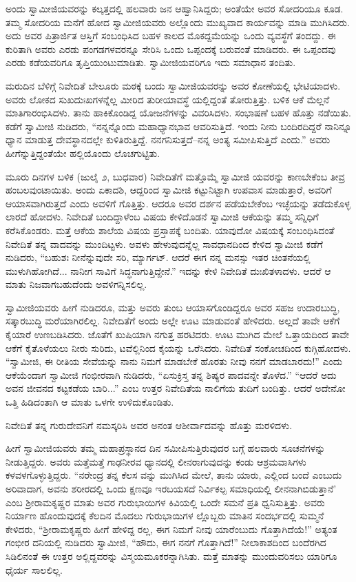 ಅಂದು ಸ್ವಾಮೀಜಿಯವರನ್ನು ಕಲ್ಕತ್ತದಲ್ಲಿ ಹಲವಾರು ಜನ ಆಹ್ವಾನಿಸಿದ್ದರು; ಅಂತೆಯೇ ಅವರ ಸೋದರಿಯೂ ಕೂಡ. ತಮ್ಮ ಸೋದರಿಯ ಮನೆಗೆ ಹೋದ ಸ್ವಾಮೀಜಿಯವರು ಅಲ್ಲೊಂದು ಮುಖ್ಯವಾದ ಕಾರ್ಯವನ್ನು ಮಾಡಿ ಮುಗಿಸಿದರು. ಅದು ಅವರ ಪಿತ್ರಾರ್ಜಿತ ಆಸ್ತಿಗೆ ಸಂಬಂಧಿಸಿದ ಬಹಳ ಕಾಲದ ಮೊಕದ್ದಮೆಯನ್ನು ಒಂದು ವ್ಯವಸ್ಥೆಗೆ ತಂದದ್ದು. ಈ ಕುರಿತಾಗಿ ಅವರು ಎರಡು ಪಂಗಡಗಳವರನ್ನೂ ಸೇರಿಸಿ ಒಂದು ಒಪ್ಪಂದಕ್ಕೆ ಬರುವಂತೆ ಮಾಡಿದರು. ಈ ಒಪ್ಪಂದವು ಎರಡು ಕಡೆಯವರಿಗೂ ತೃಪ್ತಿಯುಂಟುಮಾಡಿತು. ಸ್ವಾಮೀಜಿಯವರಿಗೂ ಇದು ಸಮಾಧಾನ ತಂದಿತು.

ಮರುದಿನ ಬೆಳಿಗ್ಗೆ ನಿವೇದಿತೆ ಬೇಲೂರು ಮಠಕ್ಕೆ ಬಂದು ಸ್ವಾಮೀಜಿಯವರನ್ನು ಅವರ ಕೋಣೆಯಲ್ಲಿ ಭೇಟಿಯಾದಳು. ಅವರು ಲೋಕದ ಸುಖದುಃಖಗಳನ್ನೆಲ್ಲ ಮೀರಿದ ತುರೀಯಾವಸ್ಥೆ ಯಲ್ಲಿದ್ದಂತೆ ತೋರುತ್ತಿತ್ತು. ಬಳಿಕ ಆಕೆ ಮೆಲ್ಲನೆ ಮಾತಿಗಾರಂಭಿಸಿದಳು. ತಾನು ಹಾಕಿಕೊಂಡಿದ್ದ ಯೋಜನೆಗಳನ್ನು ವಿವರಿಸಿದಳು. ಸಂಭಾಷಣೆ ಬಹಳ ಹೊತ್ತು ನಡೆಯಿತು. ಕಡೆಗೆ ಸ್ವಾಮೀಜಿ ನುಡಿದರು, “ನನ್ನನ್ನೊಂದು ಮಹಾಧ್ಯಾನಭಾವ ಆವರಿಸುತ್ತಿದೆ. ಇಂದು ನೀನು ಬಂದಿರದಿದ್ದರೆ ನಾನಿನ್ನೂ ಧ್ಯಾನ ಮಾಡುತ್ತ ದೇವಸ್ಥಾನದಲ್ಲೇ ಕುಳಿತಿರುತ್ತಿದ್ದೆ. ನನಗನಿಸುತ್ತದೆ–ನನ್ನ ಅಂತ್ಯ ಸಮೀಪಿಸುತ್ತಿದೆ ಎಂದು.” ಅವರು ಹೀಗೆನ್ನುತ್ತಿದ್ದಂತೆಯೇ ಹಲ್ಲಿಯೊಂದು ಲೊಚಗುಟ್ಟಿತು.

ಮೂರು ದಿನಗಳ ಬಳಿಕ (ಜುಲೈ ೨, ಬುಧವಾರ) ನಿವೇದಿತೆಗೆ ಮತ್ತೊಮ್ಮೆ ಸ್ವಾಮೀಜಿ ಯವರನ್ನು ಕಾಣಬೇಕೆಂಬ ತೀವ್ರ ಹಂಬಲವುಂಟಾಯಿತು. ಅಂದು ಏಕಾದಶಿ, ಆದ್ದರಿಂದ ಸ್ವಾಮೀಜಿ ಕಟ್ಟುನಿಟ್ಟಾಗಿ ಉಪವಾಸ ಮಾಡುತ್ತಾರೆ, ಅವರಿಗೆ ಆಯಾಸವಾಗಿರುತ್ತದೆ ಎಂದು ಅವಳಿಗೆ ಗೊತ್ತಿತ್ತು. ಆದರೂ ಅವರ ದರ್ಶನ ಪಡೆಯಬೇಕೆಂಬ ಇಚ್ಛೆಯನ್ನು ತಡೆದುಕೊಳ್ಳ ಲಾರದೆ ಹೋದಳು. ನಿವೇದಿತೆ ಬಂದಿದ್ದಾಳೆಂಬ ವಿಷಯ ಕೇಳಿದೊಡನೆ ಸ್ವಾಮೀಜಿ ಆಕೆಯನ್ನು ತಮ್ಮ ಸನ್ನಿಧಿಗೆ ಕರೆಸಿಕೊಂಡರು. ಮತ್ತೆ ಆಕೆಯ ಶಾಲೆಯ ವಿಷಯ ಪ್ರಸ್ತಾಪಕ್ಕೆ ಬಂದಿತು. ಯಾವುದೋ ವಿಷಯಕ್ಕೆ ಸಂಬಂಧಿಸಿದಂತೆ ನಿವೇದಿತೆ ತನ್ನ ವಾದವನ್ನು ಮುಂದಿಟ್ಟಳು. ಅವಳು ಹೇಳುವುದನ್ನೆಲ್ಲ ಸಾವಧಾನದಿಂದ ಕೇಳಿದ ಸ್ವಾಮೀಜಿ ಕಡೆಗೆ ನುಡಿದರು, “ಬಹುಶಃ ನೀನೆನ್ನುವುದೇ ಸರಿ, ಮ್ಯಾರ್ಗಟ್. ಆದರೆ ಈಗ ನನ್ನ ಮನಸ್ಸು ಇತರ ಚಿಂತನೆಯಲ್ಲಿ ಮುಳುಗಿಹೋಗಿದೆ... ನಾನೀಗ ಸಾವಿಗೆ ಸಿದ್ಧನಾಗುತ್ತಿದ್ದೇನೆ.” ಇದನ್ನು ಕೇಳಿ ನಿವೇದಿತೆ ದುಃಖಿತಳಾದಳು. ಆದರೆ ಆ ಮಾತು ನಿಜವಾಗಬಹುದೆಂದು ಅವಳಿಗನ್ನಿಸಲಿಲ್ಲ.

ಸ್ವಾಮೀಜಿಯವರು ಹೀಗೆ ನುಡಿದರೂ, ಮತ್ತು ಅವರು ತುಂಬ ಆಯಾಸಗೊಂಡಿದ್ದರೂ ಅವರ ಸಹಜ ಉದಾರಬುದ್ಧಿ, ಸತ್ಕಾರಬುದ್ಧಿ ಮರೆಯಾಗಿರಲಿಲ್ಲ. ನಿವೇದಿತೆಗೆ ಅಂದು ಅಲ್ಲೇ ಊಟ ಮಾಡುವಂತೆ ಹೇಳಿದರು. ಅಲ್ಲದೆ ತಾವೇ ಆಕೆಗೆ ಕೈಯಾರೆ ಉಣಬಡಿಸಿದರು. ಜೊತೆಗೆ ಖುಷಿಯಾಗಿ ನಗುತ್ತ ಹರಟಿದರು. ಊಟ ಮುಗಿದ ಮೇಲೆ ಒತ್ತಾಯದಿಂದ ತಾವೇ ಆಕೆಗೆ ಕೈತೊಳೆಯಲು ನೀರು ಸುರಿದು, ಟವೆಲ್ಲಿನಿಂದ ಕೈಯನ್ನು ಒರೆಸಿದರು. ನಿವೇದಿತೆ ಸಂಕೋಚದಿಂದ ಕುಗ್ಗಿಹೋದಳು. “ಸ್ವಾಮೀಜಿ, ಈ ರೀತಿಯ ಸೇವೆಯನ್ನು ನಾನು ನಿಮಗೆ ಮಾಡಬೇಕೆ ಹೊರತು ನೀವು ನನಗೆ ಮಾಡಬಾರದು!” ಎಂದು ಆಕೆಯೆಂದಾಗ ಸ್ವಾಮೀಜಿ ಗಂಭೀರವಾಗಿ ನುಡಿದರು, “ಏಸುಕ್ರಿಸ್ತ ತನ್ನ ಶಿಷ್ಯರ ಪಾದವನ್ನೇ ತೊಳೆದ.” “ಆದರೆ ಅದು ಅವನ ಜೀವನದ ಕಟ್ಟಕಡೆಯ ಬಾರಿ...” ಎಂಬ ಉತ್ತರ ನಿವೇದಿತೆಯ ನಾಲಿಗೆಯ ತುದಿಗೆ ಬಂದಿತ್ತು. ಆದರೆ ಅದೇನೋ ಒತ್ತಿ ಹಿಡಿದಂತಾಗಿ ಆ ಮಾತು ಒಳಗೇ ಉಳಿದುಕೊಂಡಿತು.

ನಿವೇದಿತೆ ತನ್ನ ಗುರುದೇವನಿಗೆ ನಮಸ್ಕರಿಸಿ ಅವರ ಅನಂತ ಆಶೀರ್ವಾದವನ್ನು ಹೊತ್ತು ಮರಳಿದಳು.

ಹೀಗೆ ಸ್ವಾಮೀಜಿಯವರು ತಮ್ಮ ಮಹಾಪ್ರಸ್ಥಾನದ ದಿನ ಸಮೀಪಿಸುತ್ತಿರುವುದರ ಬಗ್ಗೆ ಹಲವಾರು ಸೂಚನೆಗಳನ್ನು ನೀಡುತ್ತಿದ್ದರು. ಅವರು ಮತ್ತೆಮತ್ತೆ ಗಾಢನೀರವ ಧ್ಯಾನದಲ್ಲಿ ಲೀನರಾಗುವುದನ್ನು ಕಂಡು ಆಶ್ರಮವಾಸಿಗಳು ಕಳವಳಗೊಳ್ಳುತ್ತಿದ್ದರು. “ನರೇಂದ್ರ ತನ್ನ ಕೆಲಸ ವನ್ನು ಮುಗಿಸಿದ ಮೇಲೆ, ತಾನು ಯಾರು, ಎಲ್ಲಿಂದ ಬಂದೆ ಎಂಬುದು ಅರಿವಾದಾಗ, ಅವನು ಶರೀರದಲ್ಲಿ ಒಂದು ಕ್ಷಣವೂ ಇರಬಯಸದೆ ನಿರ್ವಿಕಲ್ಪ ಸಮಾಧಿಯಲ್ಲಿ ಲೀನನಾಗಿಬಿಡುತ್ತಾನೆ’ ಎಂಬ ಶ್ರೀರಾಮಕೃಷ್ಣರ ಮಾತು ಅವರ ಗುರುಭಾಯಿಗಳ ಕಿವಿಯಲ್ಲಿ ಒಂದೇ ಸಮನೆ ಪ್ರತಿ ಧ್ವನಿಸುತ್ತಿತ್ತು. ಅವರು ನಿರ್ಯಾಣ ಹೊಂದುವುದಕ್ಕೆ ಕೆಲದಿನ ಮೊದಲು ಗುರುಭಾಯಿಗಳ ಲ್ಲೊಬ್ಬರು ಮಾತಿನ ಸಂದರ್ಭದಲ್ಲಿ ಸುಮ್ಮನೆ ಕೇಳಿದರು, “ಶ್ರೀರಾಮಕೃಷ್ಣರು ಹೀಗೆ ಹೇಳಿದ್ದ ರಲ್ಲ, ಈಗ ನಿಮಗೆ ನೀವು ಯಾರೆಂಬುದು ಗೊತ್ತಾಗಿದೆಯೆ!” ಅತ್ಯಂತ ಗಂಭೀರ ದನಿಯಲ್ಲಿ ನುಡಿದರು ಸ್ವಾಮೀಜಿ, “ಹೌದು, ಈಗ ನನಗೆ ಗೊತ್ತಾಗಿದೆ!” ನೀಲಾಕಾಶದಿಂದ ಬಂದೆರಗಿದ ಸಿಡಿಲಿನಂತೆ ಈ ಉತ್ತರ ಅಲ್ಲಿದ್ದವರನ್ನು ವಿಸ್ಮಯಮೂಕರನ್ನಾಗಿಸಿತು. ಮತ್ತೆ ಮಾತನ್ನು ಮುಂದುವರಿಸಲು ಯಾರಿಗೂ ಧೈರ್ಯ ಸಾಲಲಿಲ್ಲ.

